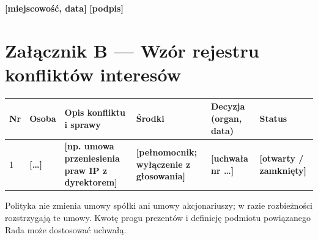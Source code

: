 \documentclass[11pt,a4paper]{report}
\newcommand{\field}[1]{\textbf{[#1]}}
\begin{document}
\field{miejscowość, data} \hfill \field{podpis}

\section*{Załącznik B --- Wzór rejestru konfliktów interesów}

\begin{center}
\small
\begin{tabularx}{\linewidth}{@{}p{0.6cm} >{\raggedright\arraybackslash}p{2.2cm} >{\raggedright\arraybackslash}X >{\raggedright\arraybackslash}p{2.6cm} >{\raggedright\arraybackslash}p{2.6cm} p{1.6cm}@{}}
\toprule
\textbf{Nr} & \textbf{Osoba} & \textbf{Opis konfliktu i sprawy} & \textbf{Środki} & \textbf{Decyzja (organ, data)} & \textbf{Status} \\
\midrule
1 & \field{\ldots} & \field{np. umowa przeniesienia praw IP z dyrektorem} & \field{pełnomocnik; wyłączenie z głosowania} & \field{uchwała nr \ldots} & \field{otwarty / zamknięty} \\
\bottomrule
\end{tabularx}
\end{center}

\vspace{1em}
{\small Polityka nie zmienia umowy spółki ani umowy akcjonariuszy; w razie rozbieżności rozstrzygają te umowy. Kwotę progu prezentów i definicję podmiotu powiązanego Rada może dostosować uchwałą.\par}
\end{document}
